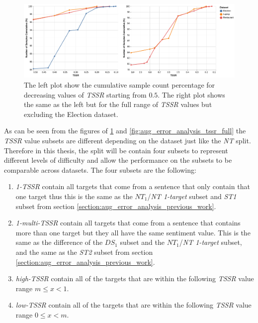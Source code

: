 \begin{figure}[!ht]
    \centering
    \includegraphics[scale=0.35]{images/augmentation/error_analysis/tssr_small_range.png}
    \caption{The left plot show the cumulative sample count percentage for decreasing values of \textit{TSSR} starting from $0.5$. The right plot shows the same as the left but for the full range of \textit{TSSR} values but excluding the Election dataset.}
    \label{fig:aug_error_analysis_tssr_small}
\end{figure}

As can be seen from the figures of \ref{fig:aug_error_analysis_tssr_small} and \ref{fig:aug_error_analysis_tssr_full} the \textit{TSSR} value subsets are different depending on the dataset just like the \textit{NT} split. Therefore in this thesis, the split will be contain four subsets to represent different levels of difficulty and allow the performance on the subsets to be comparable across datasets. The four subsets are the following:

\begin{enumerate}
    \item \textit{1-TSSR} contain all targets that come from a sentence that only contain that one target thus this is the same as the $NT_1$/\textit{NT 1-target} subset and \textit{ST1} subset from section \ref{section:aug_error_analysis_previous_work}. 
    \item \textit{1-multi-TSSR} contain all targets that come from a sentence that contains more than one target but they all have the same sentiment value. This is the same as the difference of the $DS_1$ subset and the $NT_1$/\textit{NT 1-target} subset, and the same as the \textit{ST2} subset from section \ref{section:aug_error_analysis_previous_work}.
    \item \textit{high-TSSR} contain all of the targets that are within the following \textit{TSSR} value range $m \le x < 1$. 
    \item \textit{low-TSSR} contain all of the targets that are within the following \textit{TSSR} value range $0 \le x < m$.
\end{enumerate}

